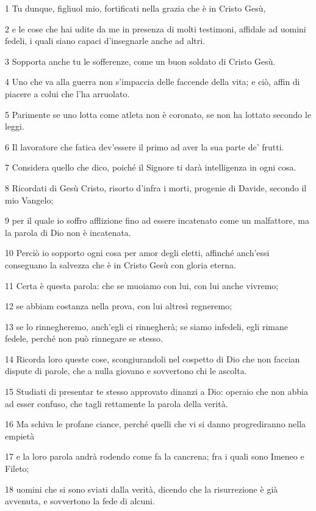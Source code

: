 \par 1 Tu dunque, figliuol mio, fortificati nella grazia che è in Cristo Gesù,
\par 2 e le cose che hai udite da me in presenza di molti testimoni, affidale ad uomini fedeli, i quali siano capaci d'insegnarle anche ad altri.
\par 3 Sopporta anche tu le sofferenze, come un buon soldato di Cristo Gesù.
\par 4 Uno che va alla guerra non s'impaccia delle faccende della vita; e ciò, affin di piacere a colui che l'ha arruolato.
\par 5 Parimente se uno lotta come atleta non è coronato, se non ha lottato secondo le leggi.
\par 6 Il lavoratore che fatica dev'essere il primo ad aver la sua parte de' frutti.
\par 7 Considera quello che dico, poiché il Signore ti darà intelligenza in ogni cosa.
\par 8 Ricordati di Gesù Cristo, risorto d'infra i morti, progenie di Davide, secondo il mio Vangelo;
\par 9 per il quale io soffro afflizione fino ad essere incatenato come un malfattore, ma la parola di Dio non è incatenata.
\par 10 Perciò io sopporto ogni cosa per amor degli eletti, affinché anch'essi conseguano la salvezza che è in Cristo Gesù con gloria eterna.
\par 11 Certa è questa parola: che se muoiamo con lui, con lui anche vivremo;
\par 12 se abbiam costanza nella prova, con lui altresì regneremo;
\par 13 se lo rinnegheremo, anch'egli ci rinnegherà; se siamo infedeli, egli rimane fedele, perché non può rinnegare se stesso.
\par 14 Ricorda loro queste cose, scongiurandoli nel cospetto di Dio che non faccian dispute di parole, che a nulla giovano e sovvertono chi le ascolta.
\par 15 Studiati di presentar te stesso approvato dinanzi a Dio: operaio che non abbia ad esser confuso, che tagli rettamente la parola della verità.
\par 16 Ma schiva le profane ciance, perché quelli che vi si danno progrediranno nella empietà
\par 17 e la loro parola andrà rodendo come fa la cancrena; fra i quali sono Imeneo e Fileto;
\par 18 uomini che si sono sviati dalla verità, dicendo che la risurrezione è già avvenuta, e sovvertono la fede di alcuni.
